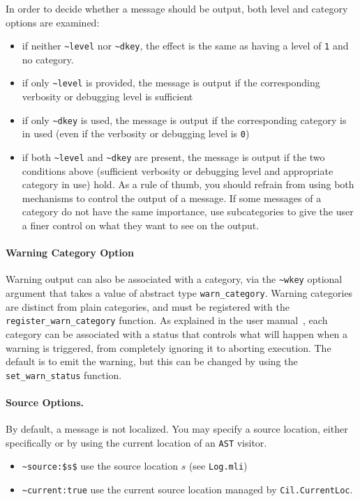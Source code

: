 In order to decide whether a message should be output, both level and category
options are examined:
\begin{itemize}
\item if neither \lstinline|~level| nor \lstinline|~dkey|, the effect is the
  same as having a level of \lstinline|1| and no category.
\item if only \lstinline|~level| is provided, the message is output if the
  corresponding verbosity or debugging level is sufficient
\item if only \lstinline|~dkey| is used, the message is output if the
  corresponding category is in used 
  (even if the verbosity or debugging level is \lstinline|0|)
\item if both \lstinline|~level| and \lstinline|~dkey| are present,
  the message is output if the two conditions above
  (sufficient verbosity or debugging level and appropriate category in use)
  hold. As a rule of thumb, you should refrain from using both mechanisms to
  control the output of a message. If some messages of a category do not have
  the same importance, use subcategories to give the user a finer control on
  what they want to see on the output.
\end{itemize}

\paragraph{Warning Category Option} Warning output can also
be associated with a category, via the \lstinline|~wkey| optional argument
that takes a value of abstract type
\lstinline|warn_category|. Warning categories
are distinct from plain categories, and must be registered with the
\lstinline|register_warn_category| function. As explained in the user
manual~\cite{userman}, each category can be associated with a status that
controls what will happen when a warning is triggered, from completely ignoring
it to aborting execution. The default is to emit the warning, but this can
be changed by using the
\lstinline|set_warn_status| function.

\paragraph{Source Options.} By default, a message is not localized. You may
specify a source location, either specifically or by using the current
location of an \texttt{AST} visitor.
\begin{itemize}
\item[] \lstinline{~source:$s$} use the source location $s$ (see \texttt{Log.mli})
\item[] \lstinline{~current:true} use the current source location
  managed by \texttt{Cil.CurrentLoc}.
\end{itemize}

